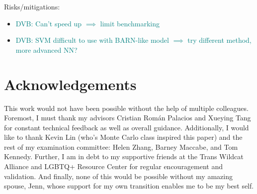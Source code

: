 \documentclass[12pt]{article}
\newcommand{\dvb}[1]{\textcolor{teal}{DVB: #1}}  %
\begin{document}
Risks/mitigations:

\begin{itemize}
\item \dvb{Can't speed up $\implies$ limit benchmarking}
\item \dvb{SVM difficult to use with BARN-like model $\implies$ try different method, more advanced NN?}
\end{itemize}



\section*{Acknowledgements}

This work would not have been possible without the help of multiple colleagues.  Foremost, I must thank my advisors Cristian Rom{\'a}n Palacios and Xueying Tang for constant technical feedback as well as overall guidance.  Additionally, I would like to thank Kevin Lin (who's Monte Carlo class inspired this paper) and the rest of my examination committee: Helen Zhang, Barney Maccabe, and Tom Kennedy.  Further, I am in debt to my supportive friends at the Trans Wildcat Alliance and LGBTQ+ Resource Center for regular encouragement and validation.  And finally, none of this would be possible without my amazing spouse, Jenn, whose support for my own transition enables me to be my best self.

\clearpage


\end{document}
